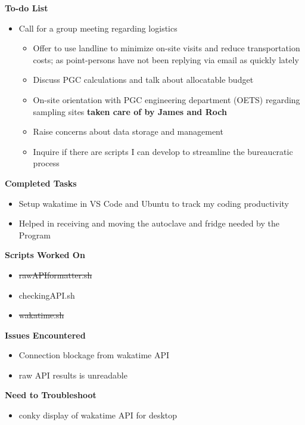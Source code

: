 \documentclass[11pt]{report}
\newcommand{\done}{\checkmark}
\newcommand{\moved}{\faArrowCircleRight}
\newcommand{\deprecated}[1]{\sout{#1}}
\begin{document}
{\begin{multicols}{2}
\textbf{To-do List}
\begin{itemize}
	\item [\moved] Call for a group meeting regarding logistics 
	
	\begin{itemize}
		\item [\done] Offer to use landline to minimize on-site visits and reduce transportation costs; as point-persons have not been replying via email as quickly lately
		\item [\done] Discuss PGC calculations and talk about allocatable budget
		\item [\done] On-site orientation with PGC engineering department (OETS) regarding sampling sites \textbf{taken care of by James and Roch}
		\item [\moved] Raise concerns about data storage and management
		\item [\moved] Inquire if there are scripts I can develop to streamline the bureaucratic process
	\end{itemize}
\end{itemize}

\textbf{Completed Tasks}
\begin{itemize}
	\item Setup wakatime in VS Code and Ubuntu to track my coding productivity
	\item Helped in receiving and moving the autoclave and fridge needed by the Program
	
\end{itemize}

\textbf{Scripts Worked On}
\begin{itemize}
	\item \deprecated{rawAPIformatter.sh}
	\item [\done] checkingAPI.sh
	\item \deprecated{wakatime.sh}
\end{itemize}


\textbf{Issues Encountered}
\begin{itemize}
	\item [\done] Connection blockage from wakatime API
	\item [\moved] raw API results is unreadable
\end{itemize}

\textbf{Need to Troubleshoot}
\begin{itemize}
	\item conky display of wakatime API for desktop
\end{itemize}
\end{multicols}

}
\end{document}
